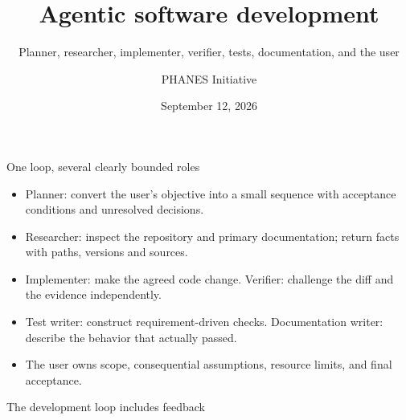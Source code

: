 \documentclass[aspectratio=169,11pt]{beamer}
\title{Agentic software development}
\subtitle{Planner, researcher, implementer, verifier, tests, documentation, and the user}
\author{PHANES Initiative}
\institute{The University of Texas at Austin}
\date{September 12, 2026}
\begin{document}
\begin{frame}[plain]
\titlepage
\end{frame}
\begin{frame}[t,fragile]{One loop, several clearly bounded roles}
\fontsize{11.5}{14}\selectfont
\begin{itemize}\setlength{\itemsep}{2mm}
\item Planner: convert the user's objective into a small sequence with acceptance conditions and unresolved decisions.
\item Researcher: inspect the repository and primary documentation; return facts with paths, versions and sources.
\item Implementer: make the agreed code change. Verifier: challenge the diff and the evidence independently.
\item Test writer: construct requirement-driven checks. Documentation writer: describe the behavior that actually passed.
\item The user owns scope, consequential assumptions, resource limits, and final acceptance.
\end{itemize}
\end{frame}
\begin{frame}[t,fragile]{The development loop includes feedback}
\begin{center}
\end{center}
\end{frame}
\end{document}
